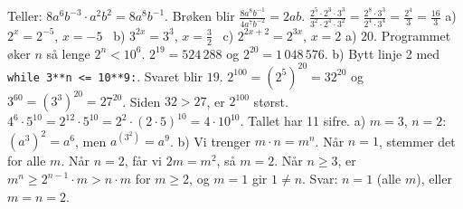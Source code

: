  Teller: $8a^6b^{-3} \cdot a^2b^2 = 8a^8b^{-1}$. Brøken blir $\frac{8a^8b^{-1}}{4a^7b^{-2}} = 2ab$.
 $\frac{2^5 \cdot 2^3 \cdot 3^3}{3^2 \cdot 2^4 \cdot 3^2} = \frac{2^8 \cdot 3^3}{2^4 \cdot 3^4} = \frac{2^4}{3} = \frac{16}{3}$
 a) $2^x = 2^{-5}$, $x = -5$ \ b) $3^{2x} = 3^3$, $x = \frac{3}{2}$ \ c) $2^{2x+2} = 2^{3x}$, $x = 2$
 a) $20$. Programmet øker $n$ så lenge $2^n < 10^6$. $2^{19} = 524\,288$ og $2^{20} = 1\,048\,576$.
b) Bytt linje 2 med \lstinline[style=laereverk,numbers=none,frame=none]|while 3**n <= 10**9:|. Svaret blir $19$.
 $2^{100} = (2^5)^{20} = 32^{20}$ og $3^{60} = (3^3)^{20} = 27^{20}$. Siden $32 > 27$, er $2^{100}$ størst.
 $4^6 \cdot 5^{10} = 2^{12} \cdot 5^{10} = 2^2 \cdot (2 \cdot 5)^{10} = 4 \cdot 10^{10}$. Tallet har 11 sifre.
 a) $m = 3$, $n = 2$: $(a^3)^2 = a^6$, men $a^{(3^2)} = a^9$.
b) Vi trenger $m \cdot n = m^n$. Når $n = 1$, stemmer det for alle $m$. Når $n = 2$, får vi $2m = m^2$, så $m = 2$.
Når $n \ge 3$, er $m^n \ge 2^{n-1} \cdot m > n \cdot m$ for $m \ge 2$, og $m = 1$ gir $1 \ne n$.
Svar: $n = 1$ (alle $m$), eller $m = n = 2$.
